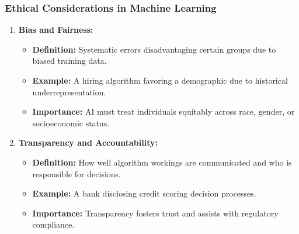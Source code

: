 \documentclass[aspectratio=169]{beamer}
\begin{document}
\begin{frame}[fragile]
    \frametitle{Ethical Considerations in Machine Learning}
    \begin{enumerate}
        \item \textbf{Bias and Fairness:}
        \begin{itemize}
            \item \textbf{Definition:} Systematic errors disadvantaging certain groups due to biased training data.
            \item \textbf{Example:} A hiring algorithm favoring a demographic due to historical underrepresentation.
            \item \textbf{Importance:} AI must treat individuals equitably across race, gender, or socioeconomic status.
        \end{itemize}
        
        \item \textbf{Transparency and Accountability:}
        \begin{itemize}
            \item \textbf{Definition:} How well algorithm workings are communicated and who is responsible for decisions.
            \item \textbf{Example:} A bank disclosing credit scoring decision processes.
            \item \textbf{Importance:} Transparency fosters trust and assists with regulatory compliance.
        \end{itemize}
    \end{enumerate}
\end{frame}
\end{document}
